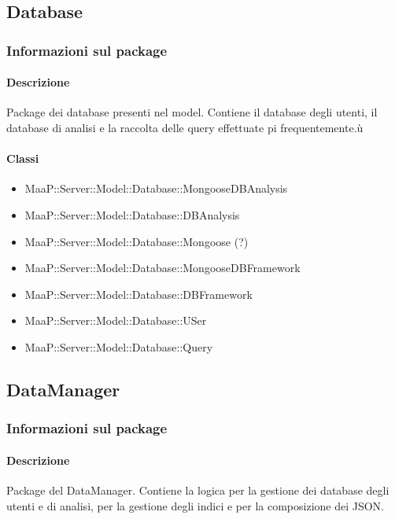 \subsection{Database}
\subsubsection{Informazioni sul package}
\paragraph{Descrizione}
Package dei database presenti nel model. Contiene il database degli utenti, il database di analisi e la raccolta delle query effettuate pi frequentemente.\`{u}

\paragraph{Classi}
\begin{itemize}
\item MaaP::Server::Model::Database::MongooseDBAnalysis
\item MaaP::Server::Model::Database::DBAnalysis
\item MaaP::Server::Model::Database::Mongoose (?)
\item MaaP::Server::Model::Database::MongooseDBFramework
\item MaaP::Server::Model::Database::DBFramework
\item MaaP::Server::Model::Database::USer
\item MaaP::Server::Model::Database::Query
\end{itemize}

\subsection{DataManager}
\subsubsection{Informazioni sul package}
\paragraph{Descrizione}
Package del DataManager. Contiene la logica per la gestione dei database degli utenti e di analisi, per la gestione degli indici e per la composizione dei JSON. 

